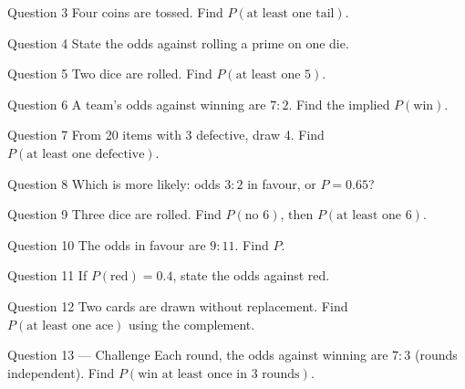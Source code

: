 \documentclass[11pt]{article}
\begin{document}
\begin{qbox}{Question 3}
Four coins are tossed. Find $P(\text{at least one tail})$.\workspace{2.4cm}
\end{qbox}

\begin{qbox}{Question 4}
State the odds against rolling a prime on one die.\workspace{2.4cm}
\end{qbox}

\begin{qbox}{Question 5}
Two dice are rolled. Find $P(\text{at least one 5})$.\workspace{2.4cm}
\end{qbox}

\begin{qbox}{Question 6}
A team's odds against winning are $7:2$. Find the implied $P(\text{win})$.\workspace{2.4cm}
\end{qbox}

\begin{qbox}{Question 7}
From 20 items with 3 defective, draw 4. Find $P(\text{at least one defective})$.\workspace{2.4cm}
\end{qbox}

\begin{qbox}{Question 8}
Which is more likely: odds $3:2$ in favour, or $P=0.65$?\workspace{2.4cm}
\end{qbox}

\begin{qbox}{Question 9}
Three dice are rolled. Find $P(\text{no 6})$, then $P(\text{at least one 6})$.\workspace{2.4cm}
\end{qbox}

\begin{qbox}{Question 10}
The odds in favour are $9:11$. Find $P$.\workspace{2.4cm}
\end{qbox}

\begin{qbox}{Question 11}
If $P(\text{red})=0.4$, state the odds against red.\workspace{2.4cm}
\end{qbox}

\begin{qbox}{Question 12}
Two cards are drawn without replacement. Find $P(\text{at least one ace})$ using the complement.\workspace{2.4cm}
\end{qbox}

\begin{qbox}{Question 13 --- Challenge}
Each round, the odds against winning are $7:3$ (rounds independent). Find $P(\text{win at least once in 3 rounds})$.\workspace{3cm}
\end{qbox}
\end{document}
